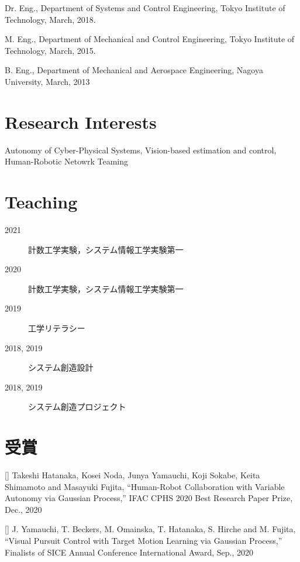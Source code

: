 \documentclass[letterpaper]{article}
\newcounter{award}
\renewenvironment{itemize}{
  \begin{list}{}{
    \setlength{\leftmargin}{1.5em}
  }
}{
  \end{list}
}
\begin{document}
\begin{itemize}
  \item Dr. Eng., Department of Systems and Control Engineering, Tokyo Institute of Technology, March, 2018.
  \item M. Eng., Department of Mechanical and Control Engineering, Tokyo Institute of Technology, March, 2015.
  \item B. Eng., Department of Mechanical and Aerospace Engineering, Nagoya University, March, 2013
\end{itemize}


\section*{Research Interests}

Autonomy of Cyber-Physical Systems, Vision-based estimation and control, Human-Robotic Netowrk Teaming

\section*{Teaching}

\begin{description}
  \item[2021] 計数工学実験，システム情報工学実験第一
  \item[2020] 計数工学実験，システム情報工学実験第一
  \item[2019] 工学リテラシー
  \item[2018, 2019] システム創造設計
  \item[2018, 2019] システム創造プロジェクト
\end{description}


\section*{受賞}

[] 
  Takeshi Hatanaka, Kosei Noda, Junya Yamauchi, Koji Sokabe, Keita Shimamoto and Masayuki Fujita, 
  ``Human-Robot Collaboration with Variable Autonomy via Gaussian Process,'' 
  IFAC CPHS 2020 Best Research Paper Prize, Dec., 2020 \\
\addtocounter{award}{-1}

[] 
  J. Yamauchi, T. Beckers, M. Omainska, T. Hatanaka, S. Hirche and M. Fujita, 
  ``Visual Pursuit Control with Target Motion Learning via Gaussian Process,'' 
  Finalists of SICE Annual Conference International Award, Sep., 2020 \\
\addtocounter{award}{-1}
\end{document}
